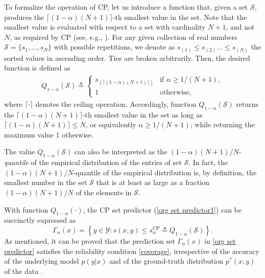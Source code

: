 \documentclass[12pt, draftclsnofoot, onecolumn]{IEEEtran}
\begin{document}
To formalize the operation of CP, let us introduce a function that, given a set $\mathcal{S}$, produces the $\lceil (1-\alpha)(N+1)\rceil$-th smallest value in the set. Note that the smallest value is evaluated with respect to a set with cardinality $N+1$, and not $N$, as required by CP 
(see, e.g., \cite{barber2021predictive}). For any given collection of real numbers $\mathcal{S}=\{s_1,...,s_{N}\}$ with possible repetitions, we denote as $s_{(1)}\leq s_{(2)}\ldots\leq s_{(N)}$ the sorted values in ascending order. Ties are broken arbitrarily. Then, the desired function is defined as
\begin{align}\label{quantile_function}
    Q_{1-\alpha}\left(\mathcal{S}\right) \triangleq
    \begin{cases}
        s_{(\lceil (1-\alpha)(N+1)\rceil)} & \text{if $\alpha \geq 1/(N+1)$}, \\
        1 & \text{otherwise},
    \end{cases}
\end{align}
where $\lceil \cdot \rceil$ denotes the ceiling operation. Accordingly, function $Q_{1-\alpha}\left(\mathcal{S}\right)$ returns the $\lceil (1-\alpha)(N+1)\rceil$-th smallest value in the set as long as $\lceil (1-\alpha)(N+1)\rceil\leq N$, or equivalently $\alpha \geq 1/(N+1)$; while returning the maximum value 1  otherwise.

The value  $Q_{1-\alpha}\left(\mathcal{S}\right)$ can also be interpreted as the $(1-\alpha)(N+1)/N$-\emph{quantile} of the empirical distribution of the entries of set $\mathcal{S}$. In fact, the $(1-\alpha)(N+1)/N$-quantile of the empirical distribution is, by definition, the smallest number in the set $\mathcal{S}$ that is at least as large as a fraction $(1-\alpha)(N+1)/N$ of the elements in $\mathcal{S}$.

With function $Q_{1-\alpha}(\cdot)$, the CP set predictor (\ref{org set predictor1}) can be succinctly expressed as
\begin{equation}\label{org set predictor}
    \Gamma_{\alpha}(x) = \left\{y\in\mathcal{Y}: s(x,y)\leq s^{\textrm{CP}}_\alpha\triangleq Q_{1-\alpha}\left(\mathcal{S}\right)\right\}.
\end{equation}
As mentioned, it can be proved that the prediction set $\Gamma_{\alpha}(x)$ in \eqref{org set predictor} satisfies the reliability condition \eqref{coverage}, irrespective of the accuracy of the underlying model $p(y|x)$ and of the ground-truth distribution $p^*(x,y)$ of the data \cite{vovk2005algorithmic, lei2014distribution}.
\end{document}
